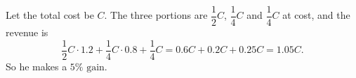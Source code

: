 Let the total cost be $C$. The three portions are $\dfrac12C$, $\dfrac14C$ and $\dfrac14C$ at cost, and the revenue is
\[\dfrac12C\cdot1.2+\dfrac14C\cdot0.8+\dfrac14C=0.6C+0.2C+0.25C=1.05C.\]
So he makes a $\boxed{5\%\text{ gain}}$.
